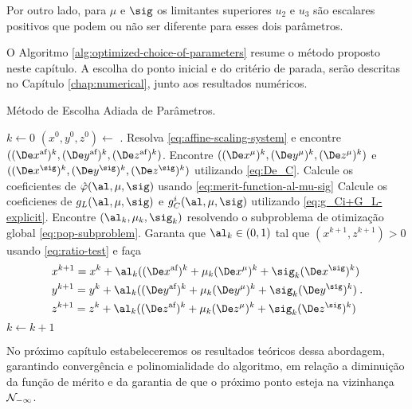 Por outro lado, para $\mu$ e $\sig$ os limitantes superiores $u_{2}$ e $u_{3}$ são escalares positivos que podem ou não ser diferente para esses dois parâmetros.

 
O Algoritmo \ref{alg:optimized-choice-of-parameters} resume o método proposto neste capítulo. A escolha do ponto inicial e do critério de parada, serão descritas no Capítulo \ref{chap:numerical}, junto aos resultados numéricos.

\begin{algorithm}
\onehalfspacing
\caption{Método de Escolha Adiada de Parâmetros.}
\label{alg:optimized-choice-of-parameters} \begin{algorithmic}[1]
\State $k \gets 0$
\State $(x^0,y^0,z^0) \gets$ .
	\Repeat
		\State Resolva   \eqref{eq:affine-scaling-system} e encontre
		$((\dex)^{k},(\dey)^{k},(\dez)^{k})$.
		\State 	Encontre $((\Dex^\mu)^{k},(\Dey^\mu)^{k},(\Dez^\mu)^{k})$ e
		$((\Dex^\sig)^{k},(\Dey^\sig)^{k},(\Dez^\sig)^{k})$ utilizando
		\eqref{eq:De_C}.
		\State Calcule os coeficientes de  $\nextphi(\al,\mu,\sig)$ usando
		\eqref{eq:merit-function-al-mu-sig} 
		\State Calcule os coeficienes de $g_{L}(\al,\mu,\sig)$ e $g^{i}_{C}(\al,\mu,\sig)$ utilizando \eqref{eq:g_Ci+G_L-explicit}.
		\State Encontre $(\al_{k},\mu_{k},\sig_{k})$ resolvendo o subproblema de
		otimização global 
		\eqref{eq:pop-subproblem}.
		\State Garanta que $\al_k\in(0,1)$ tal que $(x^{k+1},z^{k+1})>0$ usando \eqref{eq:ratio-test} e faça
		\[
		\begin{aligned}	
		& x^{k+1} = x^{k} + \al_k((\dex)^{k} + \mu_{k}(\Dex^\mu)^{k} +
		\sig_{k}(\Dex^\sig)^{k} )
		\\
		& y^{k+1} = y^{k} + \al_k((\dey)^{k} + \mu_{k}(\Dey^\mu)^{k} +
		\sig_{k}(\Dey^\sig)^{k} )
		\\
		& z^{k+1} = z^{k} + \al_k((\dez)^{k} + \mu_{k}(\Dez^\mu)^{k} +
		\sig_{k}(\Dez^\sig)^{k} ) \end{aligned}. 
		\]		
		\State $k\gets k+1$
\EndProcedure
\end{algorithmic}
\end{algorithm}
  
 No próximo capítulo estabeleceremos os resultados teóricos dessa abordagem, garantindo convergência e polinomialidade do algoritmo, em relação a diminuição da função de mérito e da garantia de que o próximo ponto esteja na vizinhança $\mathcal{N}_{-\infty}$.
 
